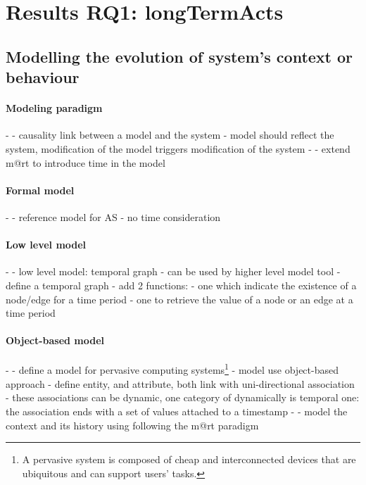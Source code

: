 \section[Results RQ1: long-term actions]{Results RQ1: \glspl{longTermAct}}
\label{sec:sota:results:actions}

\subsection[Modelling the evolution of system's context or behaviour]{Modelling the evolution of system's context or \gls{behaviour}}


\paragraph{Modeling paradigm}
- \cite{DBLP:journals/computer/BlairBF09, DBLP:journals/computer/MorinBJFS09}
	- causality link between a model and the system
	- model should reflect the system, modification of the model triggers modification of the system
- \cite{DBLP:conf/seke/0001FNMKT14, DBLP:conf/models/0001FNMKBT14}
	- extend \gls{m@rt} to introduce time in the model

\paragraph{Formal model} %
- \cite{DBLP:journals/taas/WeynsMA12}
	- reference model for AS
	- no time consideration

\paragraph{Low level model} %
- \cite{DBLP:conf/dbpl/MoffittS17}
	- low level model: temporal graph
	- can be used by higher level model tool
	- define a temporal graph
	- add 2 functions:
		- one which indicate the existence of a node/edge for a time period
		- one to retrieve the value of a node or an edge at a time period
		
\paragraph{Object-based model} %
- \cite{DBLP:conf/pervasive/HenricksenIR02}
	- define a model for pervasive computing systems\footnote{A pervasive system is composed of cheap and interconnected devices that are ubiquitous and can support users' tasks.\cite{DBLP:conf/pervasive/HenricksenIR02}}
	- model use object-based approach
	- define entity, and attribute, both link with uni-directional association
	- these associations can be dynamic, one category of dynamically is temporal one: the association ends with a set of values attached to a timestamp
- \cite{DBLP:conf/smartgridsec/0001FKNT14}
	- model the context and its history using following the \gls{m@rt} paradigm
	
